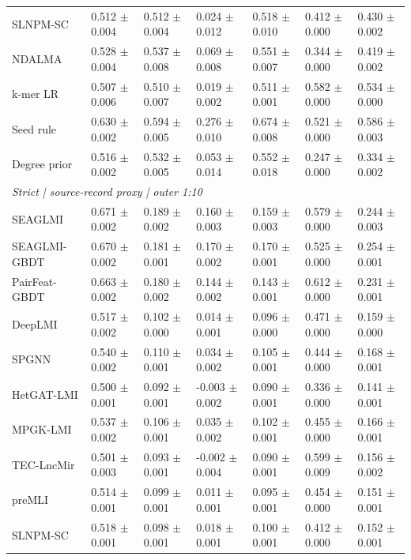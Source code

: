 \begin{landscape}
{\begin{longtable}{lllllll}
SLNPM-SC & 0.512 $\pm$ 0.004 & 0.512 $\pm$ 0.004 & 0.024 $\pm$ 0.012 & 0.518 $\pm$ 0.010 & 0.412 $\pm$ 0.000 & 0.430 $\pm$ 0.002 \\
NDALMA & 0.528 $\pm$ 0.004 & 0.537 $\pm$ 0.008 & 0.069 $\pm$ 0.008 & 0.551 $\pm$ 0.007 & 0.344 $\pm$ 0.000 & 0.419 $\pm$ 0.002 \\
k-mer LR & 0.507 $\pm$ 0.006 & 0.510 $\pm$ 0.007 & 0.019 $\pm$ 0.002 & 0.511 $\pm$ 0.001 & 0.582 $\pm$ 0.000 & 0.534 $\pm$ 0.000 \\
Seed rule & 0.630 $\pm$ 0.002 & 0.594 $\pm$ 0.005 & 0.276 $\pm$ 0.010 & 0.674 $\pm$ 0.008 & 0.521 $\pm$ 0.000 & 0.586 $\pm$ 0.003 \\
Degree prior & 0.516 $\pm$ 0.002 & 0.532 $\pm$ 0.005 & 0.053 $\pm$ 0.014 & 0.552 $\pm$ 0.018 & 0.247 $\pm$ 0.000 & 0.334 $\pm$ 0.002 \\
\multicolumn{7}{l}{\textit{Strict | source-record proxy | outer 1:10}}\\
SEAGLMI & 0.671 $\pm$ 0.002 & 0.189 $\pm$ 0.002 & 0.160 $\pm$ 0.003 & 0.159 $\pm$ 0.003 & 0.579 $\pm$ 0.000 & 0.244 $\pm$ 0.003 \\
SEAGLMI-GBDT & 0.670 $\pm$ 0.002 & 0.181 $\pm$ 0.001 & 0.170 $\pm$ 0.002 & 0.170 $\pm$ 0.001 & 0.525 $\pm$ 0.000 & 0.254 $\pm$ 0.001 \\
PairFeat-GBDT & 0.663 $\pm$ 0.002 & 0.180 $\pm$ 0.002 & 0.144 $\pm$ 0.002 & 0.143 $\pm$ 0.001 & 0.612 $\pm$ 0.000 & 0.231 $\pm$ 0.001 \\
DeepLMI & 0.517 $\pm$ 0.002 & 0.102 $\pm$ 0.000 & 0.014 $\pm$ 0.001 & 0.096 $\pm$ 0.000 & 0.471 $\pm$ 0.000 & 0.159 $\pm$ 0.000 \\
SPGNN & 0.540 $\pm$ 0.002 & 0.110 $\pm$ 0.001 & 0.034 $\pm$ 0.002 & 0.105 $\pm$ 0.001 & 0.444 $\pm$ 0.000 & 0.168 $\pm$ 0.001 \\
HetGAT-LMI & 0.500 $\pm$ 0.001 & 0.092 $\pm$ 0.001 & -0.003 $\pm$ 0.002 & 0.090 $\pm$ 0.001 & 0.336 $\pm$ 0.000 & 0.141 $\pm$ 0.001 \\
MPGK-LMI & 0.537 $\pm$ 0.002 & 0.106 $\pm$ 0.001 & 0.035 $\pm$ 0.002 & 0.102 $\pm$ 0.001 & 0.455 $\pm$ 0.000 & 0.166 $\pm$ 0.001 \\
TEC-LncMir & 0.501 $\pm$ 0.003 & 0.093 $\pm$ 0.001 & -0.002 $\pm$ 0.004 & 0.090 $\pm$ 0.001 & 0.599 $\pm$ 0.009 & 0.156 $\pm$ 0.002 \\
preMLI & 0.514 $\pm$ 0.001 & 0.099 $\pm$ 0.001 & 0.011 $\pm$ 0.001 & 0.095 $\pm$ 0.001 & 0.454 $\pm$ 0.000 & 0.151 $\pm$ 0.001 \\
SLNPM-SC & 0.518 $\pm$ 0.001 & 0.098 $\pm$ 0.001 & 0.018 $\pm$ 0.001 & 0.100 $\pm$ 0.001 & 0.412 $\pm$ 0.000 & 0.152 $\pm$ 0.001 \\

\end{longtable}}
\end{landscape}
